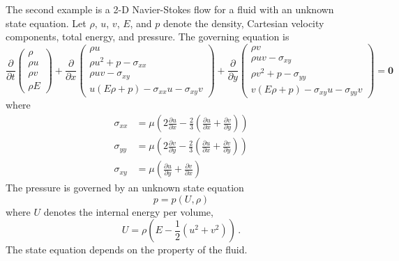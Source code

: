 \documentclass{paper1}
\begin{document}
The second example is a 2-D Navier-Stokes flow for a fluid with an unknown state equation. 
Let $\rho$, $u$, $v$, $E$, and $p$ denote the density, Cartesian velocity components, 
total energy, and pressure.
The governing equation is
\begin{equation}
    \frac{\partial}{\partial t}
    \begin{pmatrix}
        \rho \\ \rho u \\ \rho v\\ \rho E
    \end{pmatrix}
    + \frac{\partial}{\partial x} 
    \begin{pmatrix}
        \rho u\\
        \rho u^2 + p - \sigma_{xx}\\
        \rho uv - \sigma_{xy}\\
        u(E\rho+p) - \sigma_{xx} u - \sigma_{xy} v
    \end{pmatrix}
    + \frac{\partial}{\partial y}
    \begin{pmatrix}
        \rho v\\
        \rho uv-\sigma_{xy}\\
        \rho v^2+p-\sigma_{yy}\\
        v(E\rho+p) - \sigma_{xy} u -\sigma_{yy}v
    \end{pmatrix} 
    = \boldsymbol{0}
    \label{NSeqn}
\end{equation}
where
\begin{equation}\begin{split}
    \sigma_{xx} &= \mu \left(2 \frac{\partial u}{\partial x} - \frac{2}{3} \left(\frac{\partial u}{\partial x} 
    + \frac{\partial v}{\partial y}\right)\right)\\
    \sigma_{yy} &= \mu \left(2 \frac{\partial v}{\partial y} - \frac{2}{3} \left(\frac{\partial u}{\partial x} 
    + \frac{\partial v}{\partial y}\right)\right)\\
    \sigma_{xy}&=\mu\left(\frac{\partial u}{\partial y} + \frac{\partial v}{\partial x}\right)
\end{split}\end{equation}
The pressure is governed by an unknown state equation
\begin{equation}
    p = p(U, \rho)
    \label{state equation}
\end{equation}
where $U$ denotes the internal energy per volume,
\begin{equation}
    U = \rho\left(E-\frac{1}{2}(u^2+v^2)\right)\,.
\end{equation}
The state equation depends on the property of the fluid.\\
\end{document}
